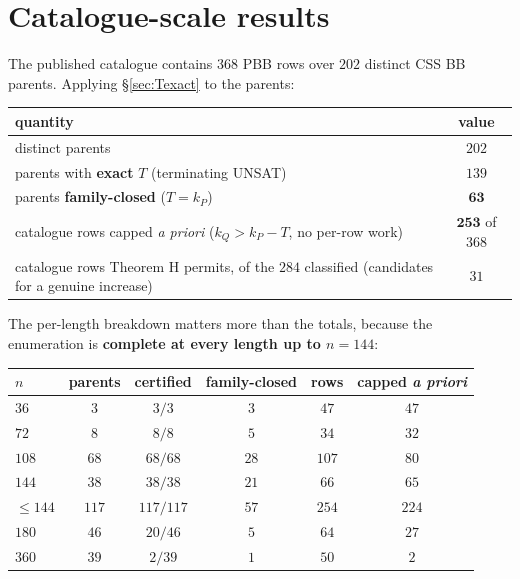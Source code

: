 \documentclass[11pt]{article}
\theoremstyle{plain}
\theoremstyle{remark}
\begin{document}
\section{Catalogue-scale results}\label{sec:catalogue}

The published catalogue \cite{cruzbenito2026evolutionary} contains $368$ PBB rows over $202$ distinct
CSS BB parents. Applying \S\ref{sec:Texact} to the parents:

\begin{table}[ht]
\centering
\begin{tabular}{lc}
\toprule
quantity & value \\
\midrule
distinct parents & $202$ \\
parents with \textbf{exact} $T$ (terminating UNSAT) & $139$ \\
parents \textbf{family-closed} ($T=k_P$) & $\mathbf{63}$ \\
catalogue rows capped \emph{a priori} ($k_Q>k_P-T$, no per-row work) & $\mathbf{253}$ of $368$ \\
catalogue rows Theorem H permits, of the $284$ classified (candidates for a genuine increase) & $31$ \\
\bottomrule
\end{tabular}
\end{table}

The per-length breakdown matters more than the totals, because the enumeration is
\textbf{complete at every length up to $n=144$}:

\begin{table}[ht]
\centering
\begin{tabular}{lccccc}
\toprule
$n$ & parents & certified & family-closed & rows & capped \emph{a priori} \\
\midrule
$36$ & $3$ & $3/3$ & $3$ & $47$ & $47$ \\
$72$ & $8$ & $8/8$ & $5$ & $34$ & $32$ \\
$108$ & $68$ & $68/68$ & $28$ & $107$ & $80$ \\
$144$ & $38$ & $38/38$ & $21$ & $66$ & $65$ \\
\textbf{$\le 144$} & \textbf{$117$} & \textbf{$117/117$} & \textbf{$57$} & \textbf{$254$} & \textbf{$224$} \\
$180$ & $46$ & $20/46$ & $5$ & $64$ & $27$ \\
$360$ & $39$ & $2/39$ & $1$ & $50$ & $2$ \\
\bottomrule
\end{tabular}
\end{table}
\end{document}
